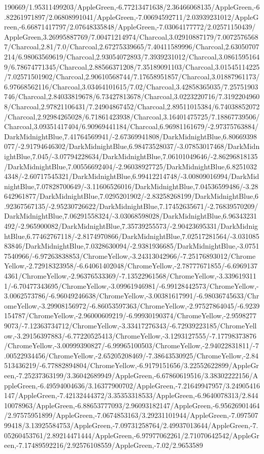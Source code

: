 {\begin{tikzternal}
190669/1.95311499203/AppleGreen,-6.77213471638/2.36466068135/AppleGreen,-6.82261971897/2.06808991041/AppleGreen,-7.00694592711/2.03939231012/AppleGreen,-6.66871417797/2.07648335848/AppleGreen,-7.03064177772/2.02571150439/AppleGreen,3.26995887769/7.00471214974/Charcoal,3.02910887179/7.00725765687/Charcoal,2.81/7.0/Charcoal,2.67275339665/7.40411589996/Charcoal,2.63050707214/6.98063569619/Charcoal,2.93054072893/7.3939231012/Charcoal,3.08615951649/6.78674771345/Charcoal,2.88566371208/7.35189091103/Charcoal,3.01545114225/7.02571501902/Charcoal,2.90610568744/7.17658951857/Charcoal,3.01887961173/6.97668562116/Charcoal,3.03464101615/7.02/Charcoal,3.42858365035/7.25751903746/Charcoal,2.84033819678/6.73427813678/Charcoal,3.0223220716/7.31922049608/Charcoal,2.97821106431/7.24904867452/Charcoal,2.89511015384/6.74038852072/Charcoal,2.92984265028/6.71861423938/Charcoal,3.16401475725/7.18867739506/Charcoal,3.09351417404/6.90969441184/Charcoal,6.96981161679/-2.97375763884/DarkMidnightBlue,7.41764569941/-2.67369941808/DarkMidnightBlue,6.80669398077/-2.91794646302/DarkMidnightBlue,6.98473528037/-3.07853017468/DarkMidnightBlue,7.045/-3.07794228634/DarkMidnightBlue,7.06101049646/-2.86296818135/DarkMidnightBlue,7.00556692404/-2.96038927725/DarkMidnightBlue,6.82510324348/-2.60717545321/DarkMidnightBlue,6.99412214748/-3.00809016994/DarkMidnightBlue,7.07828700649/-3.11606526016/DarkMidnightBlue,7.04536599486/-3.28642961877/DarkMidnightBlue,7.0295201902/-2.83258268199/DarkMidnightBlue,6.92367567135/-2.95230726622/DarkMidnightBlue,7.17452635671/-2.76839570209/DarkMidnightBlue,7.06291558324/-3.03068598028/DarkMidnightBlue,6.96343231492/-2.965900082/DarkMidnightBlue,7.35739255573/-2.90423695331/DarkMidnightBlue,6.77462767118/-2.8174970866/DarkMidnightBlue,7.02517281564/-3.03108583846/DarkMidnightBlue,7.0328630094/-2.9381936685/DarkMidnightBlue,-3.07517540966/-6.97263838853/ChromeYellow,-3.24313042966/-7.25176893012/ChromeYellow,-2.72918323958/-6.64061402048/ChromeYellow,-2.78777671855/-6.69691374361/ChromeYellow,-2.96376533369/-7.13522961568/ChromeYellow,-3.3396193111/-6.70477343695/ChromeYellow,-3.09961946981/-6.99128442573/ChromeYellow,-3.0062573786/-6.96049246638/ChromeYellow,-3.00381617991/-6.98036745633/ChromeYellow,-3.29908156972/-6.86053597363/ChromeYellow,-2.97527864045/-6.9239154787/ChromeYellow,-2.96000609219/-6.99930190374/ChromeYellow,-2.95982779073/-7.12363734712/ChromeYellow,-3.33417276343/-6.72939223185/ChromeYellow,-3.29156397883/-6.77220525413/ChromeYellow,-3.1293127555/-7.17798373876/ChromeYellow,-3.00999390827/-6.99965100503/ChromeYellow,-2.94022831811/-7.00522934456/ChromeYellow,-2.65205208469/-7.38643530925/ChromeYellow,-2.84513436219/-6.77882894804/ChromeYellow,-6.9179151656/3.22552622899/AppleGreen,-7.25237363199/3.36042689949/AppleGreen,-6.67860619516/3.38302222156/AppleGreen,-6.49594004636/3.16377900702/AppleGreen,-7.21649947957/3.24905416147/AppleGreen,-7.42132444372/3.35353318533/AppleGreen,-6.9640078313/2.84410078963/AppleGreen,-6.88653777093/2.96093182147/AppleGreen,-6.95626901464/2.97575951899/AppleGreen,-7.0674853163/3.29231101944/AppleGreen,-7.09750799418/3.13925584753/AppleGreen,-7.09731258764/2.49937013644/AppleGreen,-7.05260453761/2.89214471444/AppleGreen,-6.97977062261/2.71070642542/AppleGreen,-7.17489592216/2.92576108559/AppleGreen,-7.02/2.9653589
\end{tikzternal}}
